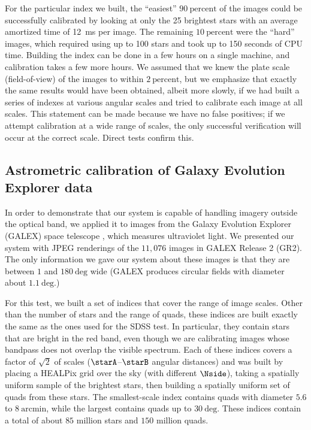 \documentclass[12pt,preprint]{aastex}
\newcommand{\unit}[1]{\mathrm{#1}}
\newcommand{\percent}{\unit{percent}}
\renewcommand{\%}{\percent}
\renewcommand{\arcmin}{\unit{arcmin}}
\renewcommand{\deg}{\unit{deg}}
\begin{document}
For the particular index we built, the ``easiest'' $90~\percent$ of
the images could be successfully calibrated by looking at only the 25
brightest stars with an average amortized time of 12~ms per image.
The remaining $10~\percent$ were the ``hard'' images, which required
using up to 100 stars and took up to 150 seconds of CPU time.
Building the index can be done in a few hours on a single machine, and
calibration takes a few more hours.  We assumed that we knew the plate
scale (field-of-view) of the images to within $2~\percent$, but we
emphasize that exactly the same results would have been obtained,
albeit more slowly, if we had built a series of indexes at various
angular scales and tried to calibrate each image at all scales.  This
statement can be made because we have no false positives; if we
attempt calibration at a wide range of scales, the only successful
verification will occur at the correct scale.  Direct tests confirm
this.

\subsection{Astrometric calibration of Galaxy Evolution Explorer data}


In order to demonstrate that our system is capable of handling imagery
outside the optical band, we applied it to images from the Galaxy
Evolution Explorer (GALEX) space telescope \citep{galex}, which
measures ultraviolet light.  We presented our system with JPEG
renderings of the $11,076$ images in GALEX Release 2 (GR2).  The only
information we gave our system about these images is that they are
between $1$ and $180~\deg$ wide (GALEX produces circular fields
with diameter about $1.1~\deg$.)

For this test, we built a set of indices that cover the range of image
scales.  Other than the number of stars and the range of quads, these
indices are built exactly the same as the ones used for the SDSS test.
In particular, they contain stars that are bright in the red band,
even though we are calibrating images whose bandpass does not overlap
the visible spectrum.  Each of these indices covers a factor of
$\sqrt{2}$ of scales ($\starA$--$\starB$ angular distances)
and was built by placing a HEALPix grid over the
sky (with different $\Nside$), taking a spatially uniform sample of
the brightest stars, then building a spatially uniform set of quads
from these stars.  The smallest-scale index contains quads with
diameter $5.6$ to $8~\arcmin$, while the largest contains quads up
to $30~\deg$.  These indices contain a total of about $85$
million stars and $150$ million quads.
\end{document}
